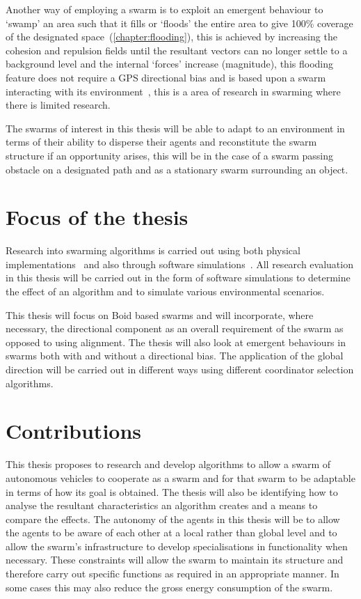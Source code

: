 Another way of employing a swarm is to exploit an emergent behaviour to `swamp' an area such that it fills or `floods' the entire area to give 100\% coverage of the designated space~(\autoref{chapter:flooding}), this is achieved by increasing the cohesion and repulsion fields until the resultant vectors can no longer settle to a background level and the internal `forces' increase (magnitude), this flooding feature does not require a GPS directional bias and is based upon a swarm interacting with its environment~\cite{BAFVM:06}, this is a area of research in swarming where there is limited research.

The swarms of interest in this thesis will be able to adapt to an environment in terms of their ability to disperse their agents and reconstitute the swarm structure if an opportunity arises, this will be in the case of a swarm passing obstacle on a designated path and as a stationary swarm surrounding an object.

\section{Focus of the thesis}
Research into swarming algorithms is carried out using both physical implementations~\cite{DOR:09, DTGT:04} and also through software simulations~\cite{BAF:06, GP:02}. All research evaluation in this thesis will be carried out in the form of software simulations to determine the effect of an algorithm and to simulate various environmental scenarios.

This thesis will focus on Boid based swarms and will incorporate, where necessary, the directional component as an overall requirement of the swarm as opposed to using alignment. The thesis will also look at emergent behaviours in swarms both with and without a directional bias. The application of the global direction will be carried out in different ways using different coordinator selection algorithms. 

\section{Contributions}
This thesis proposes to research and develop algorithms to allow a swarm of autonomous vehicles to cooperate as a swarm and for that swarm to be adaptable in terms of how its goal is obtained. The thesis will also be identifying how to analyse the resultant characteristics an algorithm creates and a means to compare the effects. The autonomy of the agents in this thesis will be to allow the agents to be aware of each other at a local rather than global level and to allow the swarm's infrastructure to develop specialisations in functionality when necessary. These constraints will allow the swarm to maintain its structure and therefore carry out specific functions as required in an appropriate manner. In some cases this may also reduce the gross energy consumption of the swarm. 

